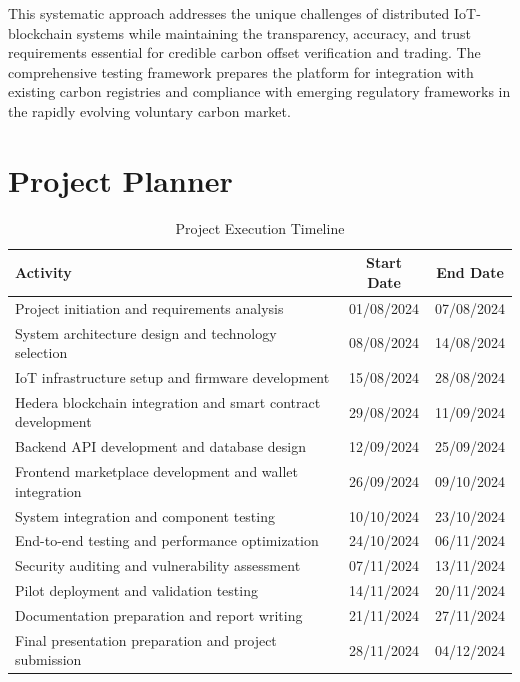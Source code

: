 \documentclass[oneside,a4paper,12pt]{book}
\renewcommand{\arraystretch}{1.4}
\begin{document}
\begin{appendices}
This systematic approach addresses the unique challenges of distributed IoT-blockchain systems while maintaining the transparency, accuracy, and trust requirements essential for credible carbon offset verification and trading. The comprehensive testing framework prepares the platform for integration with existing carbon registries and compliance with emerging regulatory frameworks in the rapidly evolving voluntary carbon market.


\chapter{Project Planner}
\label{app:plan}

\begin{table}[H]
\centering
\renewcommand{\arraystretch}{1.5}
\setlength{\tabcolsep}{8pt}
\begin{tabular}{|p{6cm}|c|c|}
\hline
\textbf{Activity} & \textbf{Start Date} & \textbf{End Date} \\
\hline
Project initiation and requirements analysis & 01/08/2024 & 07/08/2024 \\
\hline
System architecture design and technology selection & 08/08/2024 & 14/08/2024 \\
\hline
IoT infrastructure setup and firmware development & 15/08/2024 & 28/08/2024 \\
\hline
Hedera blockchain integration and smart contract development & 29/08/2024 & 11/09/2024 \\
\hline
Backend API development and database design & 12/09/2024 & 25/09/2024 \\
\hline
Frontend marketplace development and wallet integration & 26/09/2024 & 09/10/2024 \\
\hline
System integration and component testing & 10/10/2024 & 23/10/2024 \\
\hline
End-to-end testing and performance optimization & 24/10/2024 & 06/11/2024 \\
\hline
Security auditing and vulnerability assessment & 07/11/2024 & 13/11/2024 \\
\hline
Pilot deployment and validation testing & 14/11/2024 & 20/11/2024 \\
\hline
Documentation preparation and report writing & 21/11/2024 & 27/11/2024 \\
\hline
Final presentation preparation and project submission & 28/11/2024 & 04/12/2024 \\
\hline
\end{tabular}
\caption{Project Execution Timeline}
\label{fig:plan_execution}
\end{table}


\end{appendices}
\end{document}
